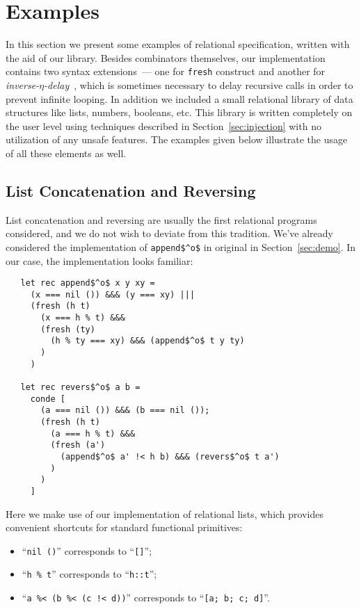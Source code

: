 \section{Examples}
\label{sec:examples}

In this section we present some examples of relational specification, written with the aid of our library.
Besides \miniKanren combinators themselves, our implementation contains two syntax extensions~--- one
for \lstinline{fresh} construct and another for \emph{inverse-$\eta$-delay}~\cite{MicroKanren}, which is
sometimes necessary to delay recursive calls in order to prevent infinite looping. In addition we included a
small relational library of data structures like lists, numbers, booleans, etc. This library is written
completely on the user level using techniques described in Section~\ref{sec:injection} with no utilization
of any unsafe features. The examples given below illustrate the usage of all these elements as well.

\subsection{List Concatenation and Reversing}

List concatenation and reversing are usually the first relational programs considered, and we do not wish
to deviate from this tradition. We've already considered the implementation of \lstinline{append$^o$} in
original \miniKanren in Section~\ref{sec:demo}. In our case, the implementation looks familiar:

\begin{lstlisting}
   let rec append$^o$ x y xy =
     (x === nil ()) &&& (y === xy) |||
     (fresh (h t)
       (x === h % t) &&&
       (fresh (ty)
         (h % ty === xy) &&& (append$^o$ t y ty)
       )
     )

   let rec revers$^o$ a b =
     conde [
       (a === nil ()) &&& (b === nil ());
       (fresh (h t)
         (a === h % t) &&&
         (fresh (a')
           (append$^o$ a' !< h b) &&& (revers$^o$ t a')
         )
       )
     ]
\end{lstlisting}

Here we make use of our implementation of relational lists, which provides convenient shortcuts for
standard functional primitives:

\begin{itemize}
  \item ``\lstinline{nil ()}'' corresponds to ``\lstinline{[]}'';
  \item ``\lstinline{h % t}'' corresponds to ``\lstinline{h::t}'';
  \item ``\lstinline{a %< (b %< (c !< d))}'' corresponds to ``\lstinline{[a; b; c; d]}''.
\end{itemize}

